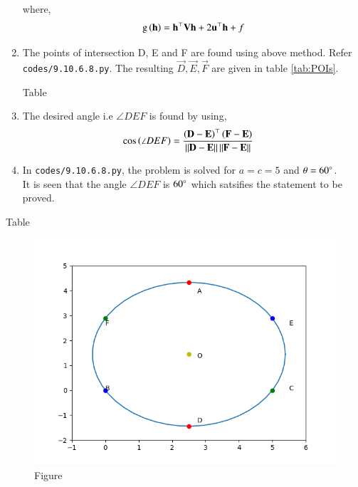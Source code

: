 \documentclass[journal,12pt,twocolumn]{IEEEtran}
\begin{document}
\begin{enumerate}
where,
\begin{align}
        \text{g}\left(\mathbf{h}\right) = \mathbf{h}^{\top}\mathbf{V}\mathbf{h} + 2\mathbf{u}^{\top}\mathbf{h} +f
\end{align}

\item The points of intersection D, E and F are found using above method. Refer \texttt{codes/9.10.6.8.py}. The resulting $ \vec{D} , \vec{E}, \vec{F}$ are given in table \ref{tab:POIs}. 
\begin{table}[h!]
\centering
	
        \caption{Table}		\label{tab:POIs}
\end{table}


\item The desired angle i.e $\angle DEF$ is found by using,
	\begin{align}
		\cos\left(\angle DEF\right) &= \frac{ \left(\mathbf{D}-\mathbf{E}\right)^{\top} \left( \mathbf{F}-\mathbf{E}\right) } { \left\lVert\mathbf{D}-\mathbf{E}\right\rVert \left\lVert\mathbf{F}-\mathbf{E}\right\rVert }
	\end{align}

\item In \texttt{codes/9.10.6.8.py}, the problem is solved for $a =c = 5$ and $ \theta = 60 \degree$.\\
	It is seen that the angle $\angle DEF$ is $ 60 \degree$ which satsifies the statement to be proved.
\end{enumerate}

\begin{table}[h!]
\centering
        
        \caption{Table}
        \label{tab:}
\end{table}

\begin{figure}[h]
  \centering
   \includegraphics[width=\linewidth,height = \linewidth]{figs/Figure_1.png}
   \caption{Figure}
   \label{fig:}
\end{figure}
\end{document}
